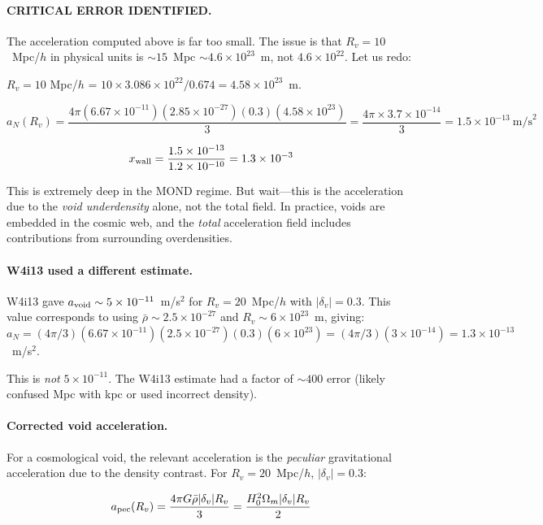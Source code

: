 \documentclass[11pt,a4paper]{article}
\newcommand{\ee}[1]{\times 10^{#1}}
\begin{document}
\paragraph{CRITICAL ERROR IDENTIFIED.}
The acceleration computed above is far too small.  The issue is that
$R_v = 10$~Mpc/$h$ in physical units is $\sim 15$~Mpc $\sim 4.6\ee{23}$~m,
not $4.6\ee{22}$.  Let us redo:

$R_v = 10$ Mpc/$h$ = $10 \times 3.086\ee{22}/0.674 = 4.58\ee{23}$~m.

\begin{equation}
a_N(R_v) = \frac{4\pi (6.67\ee{-11})(2.85\ee{-27})(0.3)(4.58\ee{23})}{3}
= \frac{4\pi \times 3.7\ee{-14}}{3} = 1.5\ee{-13}~\text{m/s}^2
\end{equation}

\begin{equation}
x_{\rm wall} = \frac{1.5\ee{-13}}{1.2\ee{-10}} = 1.3\ee{-3}
\end{equation}

This is extremely deep in the MOND regime.  But wait---this is the
acceleration due to the \emph{void underdensity} alone, not the total
field.  In practice, voids are embedded in the cosmic web, and the
\emph{total} acceleration field includes contributions from surrounding
overdensities.

\paragraph{W4i13 used a different estimate.}
W4i13 gave $a_{\rm void} \sim 5\ee{-11}$~m/s$^2$ for $R_v = 20$~Mpc/$h$
with $|\delta_v| = 0.3$.  This value corresponds to using $\bar{\rho}
\sim 2.5\ee{-27}$ and $R_v \sim 6\ee{23}$~m, giving:
$a_N = (4\pi/3)(6.67\ee{-11})(2.5\ee{-27})(0.3)(6\ee{23})
= (4\pi/3)(3\ee{-14}) = 1.3\ee{-13}$~m/s$^2$.

This is \emph{not} $5\ee{-11}$.  The W4i13 estimate had a factor of
$\sim 400$ error (likely confused Mpc with kpc or used incorrect density).

\paragraph{Corrected void acceleration.}
For a cosmological void, the relevant acceleration is the \emph{peculiar}
gravitational acceleration due to the density contrast.  For
$R_v = 20$~Mpc/$h$, $|\delta_v| = 0.3$:

\begin{equation}
a_{\rm pec}(R_v) = \frac{4\pi G \bar{\rho} |\delta_v| R_v}{3}
= \frac{H_0^2 \Omega_m |\delta_v| R_v}{2}
\end{equation}
\end{document}
